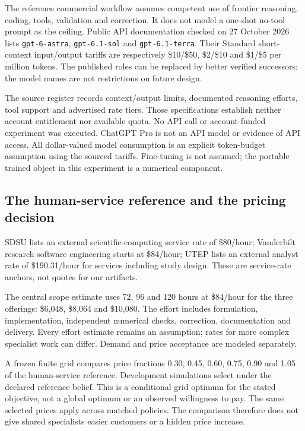 \documentclass[11pt,letterpaper]{article}
\newcommand{\usd}[1]{\$#1}
\begin{document}
The reference commercial workflow assumes competent use of frontier reasoning, coding, tools, validation and correction. It does not model a one-shot no-tool prompt as the ceiling. Public API documentation checked on 27 October 2026 lists \texttt{gpt-6-astra}, \texttt{gpt-6.1-sol} and \texttt{gpt-6.1-terra}. Their Standard short-context input/output tariffs are respectively \usd{10}/\usd{50}, \usd{2}/\usd{10} and \usd{1}/\usd{5} per million tokens. The published roles can be replaced by better verified successors; the model names are not restrictions on future design.\citep{openai_astra_2026,openai_sol_2026,openai_terra_2026}

The source register records context/output limits, documented reasoning efforts, tool support and advertised rate tiers. Those specifications establish neither account entitlement nor available quota. No API call or account-funded experiment was executed. ChatGPT Pro is not an API model or evidence of API access.\citep{chatgpt_pricing_2026} All dollar-valued model consumption is an explicit token-budget assumption using the sourced tariffs. Fine-tuning is not assumed; the portable trained object in this experiment is a numerical component.

\subsection{The human-service reference and the pricing decision}

SDSU lists an external scientific-computing service rate of \usd{80}/hour; Vanderbilt research software engineering starts at \usd{84}/hour; UTEP lists an external analyst rate of \usd{190.31}/hour for services including study design. These are service-rate anchors, not quotes for our artifacts.\citep{sdsu_services_2026,vanderbilt_rse_2026,utep_design_2026}

The central scope estimate uses 72, 96 and 120 hours at \usd{84}/hour for the three offerings: \usd{6,048}, \usd{8,064} and \usd{10,080}. The effort includes formulation, implementation, independent numerical checks, correction, documentation and delivery. Every effort estimate remains an assumption; rates for more complex specialist work can differ. Demand and price acceptance are modeled separately.

A frozen finite grid compares price fractions 0.30, 0.45, 0.60, 0.75, 0.90 and 1.05 of the human-service reference. Development simulations select \PriceFraction{} under the declared reference belief. This is a conditional grid optimum for the stated objective, not a global optimum or an observed willingness to pay. The same selected prices apply across matched policies. The comparison therefore does not give shared specialists easier customers or a hidden price increase.
\end{document}
